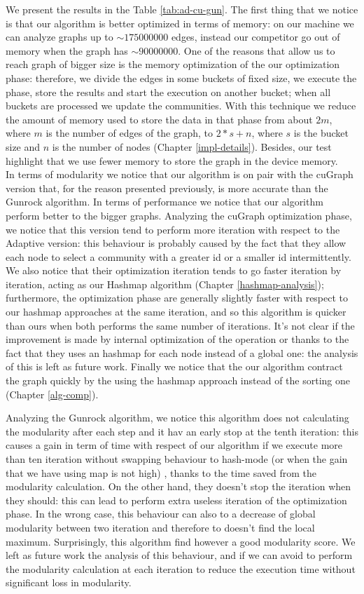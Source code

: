 We present the results in the Table \ref{tab:ad-cu-gun}. The first thing that we notice is that our algorithm is better optimized in terms of memory: on our machine we can analyze graphs up to $\sim 175 000 000$ edges, instead our competitor go out of memory when the graph has $\sim 90 000 000$. One of the reasons that allow us to reach graph of bigger size is the memory optimization of the our optimization phase: therefore, we divide the edges in some buckets of fixed size, we execute the phase, store the results and start the execution on another bucket; when all buckets are processed we update the communities. With this technique we reduce the amount of memory used to store the data in that phase from about $2m$, where $m$ is the number of edges of the graph, to $2 * s + n$, where $s$ is the bucket size and $n$ is the number of nodes (Chapter \ref{impl-details}). Besides, our test highlight that we use fewer memory to store the graph in the device memory. \\
In terms of modularity we notice that our algorithm is on pair with the cuGraph version that, for the reason presented previously, is more accurate than the Gunrock algorithm. In terms of performance we notice that our algorithm perform better to the bigger graphs. Analyzing the cuGraph optimization phase, we notice that this version tend to perform more iteration with respect to the Adaptive version: this behaviour is probably caused by the fact that they allow each node to select a community with a greater id or a smaller id intermittently.
We also notice that their optimization iteration tends to go faster iteration by iteration, acting as our Hashmap algorithm (Chapter \ref{hashmap-analysis}); furthermore, the optimization phase are generally slightly faster with respect to our hashmap approaches at the same iteration, and so this algorithm is quicker than ours when both performs the same number of iterations. It's not clear if the improvement is made by internal optimization of the operation or thanks to the fact that they uses an hashmap for each node instead of a global one: the analysis of this is left as future work. Finally we notice that the our algorithm contract the graph quickly by the using the hashmap approach instead of the sorting one (Chapter \ref{alg-comp}).


Analyzing the Gunrock algorithm, we notice this algorithm does not calculating the modularity after each step and it hav an early stop at the tenth iteration: this causes a gain in term of time with respect of our algorithm if we execute more than ten iteration without swapping behaviour to hash-mode (or when the gain that we have using map is not high) , thanks to the time saved from the modularity calculation. On the other hand, they doesn't stop the iteration when they should: this can lead to perform extra useless iteration of the optimization phase. In the wrong case, this behaviour can also to a decrease of global modularity between two iteration and therefore to doesn't find the local maximum. Surprisingly, this algorithm find however a good modularity score. We left as future work the analysis of this behaviour, and if we can avoid to perform the modularity calculation at each iteration to reduce the execution time without significant loss in modularity. 


